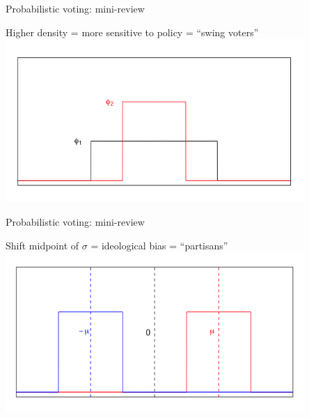 \documentclass[aspectratio=169]{beamer}
\begin{document}
\begin{frame}{Probabilistic voting: mini-review}

Higher density = more sensitive to policy = ``swing voters''
\centering
\includegraphics[width=0.85\textwidth]{pdf.png}

\end{frame}

\begin{frame}{Probabilistic voting: mini-review}

Shift midpoint of $\sigma$ = ideological bias = ``partisans''
\centering
\includegraphics[width=0.85\textwidth]{pdf2.png}

\end{frame}
\end{document}
